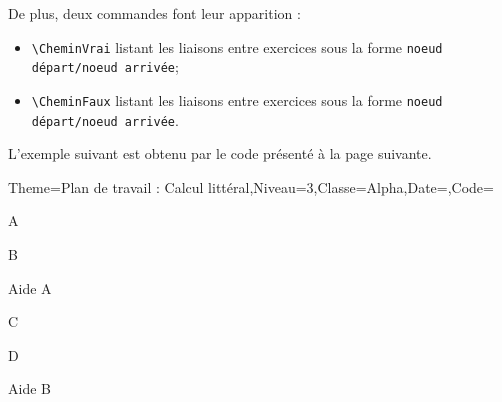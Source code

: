 \documentclass[12pt,french]{article}
\begin{document}
De plus, deux commandes font leur apparition :
\begin{itemize}
\item \lstinline!\CheminVrai! listant les liaisons entre exercices sous la forme \lstinline!noeud départ/noeud arrivée!;
\item \lstinline!\CheminFaux! listant les liaisons entre exercices sous la forme \lstinline!noeud départ/noeud arrivée!.
\end{itemize}
L'exemple suivant est obtenu par le code présenté à la page suivante.
\begin{Maquette}[PdT]{Theme=Plan de travail : Calcul littéral,Niveau=3,Classe=Alpha,Date={},Code={}}
  \setcounter{PfMExo}{0}
    \begin{minipage}{0.35\linewidth}
      \begin{exercice}%
        A
      \end{exercice}
    \end{minipage}
    \hfill
    \begin{minipage}{0.3\linewidth}
      \begin{exercice}%
        B
      \end{exercice}
    \end{minipage}
    \hfill
    \begin{minipage}{0.15\linewidth}
      \begin{SOS}%
        Aide A
      \end{SOS}
    \end{minipage}
    
    \vspace*{2cm}
    
    \begin{minipage}{0.35\linewidth}
      \begin{exercice}%
        C
      \end{exercice}
    \end{minipage}
    \hfill
    \begin{minipage}{0.3\linewidth}
      \begin{exercice}%
        D
      \end{exercice}
    \end{minipage}
    \hfill
    \begin{minipage}{0.15\linewidth}
      \begin{SOS}%
        Aide B
      \end{SOS}
    \end{minipage}
  \end{Maquette}
\end{document}
